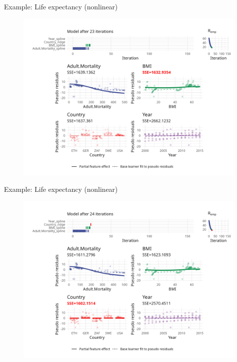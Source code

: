 \begin{frame}{Example: Life expectancy (nonlinear)}
	\begin{figure}
		\centering
		\includegraphics[width=\textwidth]{figures/cwb-anim/fig-iter-0023.png}
	\end{figure}
	\addtocounter{framenumber}{-1}
\end{frame}


\begin{frame}{Example: Life expectancy (nonlinear)}
	\begin{figure}
		\centering
		\includegraphics[width=\textwidth]{figures/cwb-anim/fig-iter-0024.png}
	\end{figure}
	\addtocounter{framenumber}{-1}
\end{frame}


